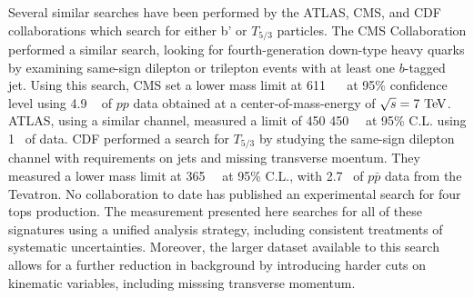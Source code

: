 Several similar searches have been performed by the ATLAS, CMS, and CDF collaborations which search for either b' or $T_{5/3}$ particles.
The CMS Collaboration performed a similar search, looking for fourth-generation down-type heavy quarks by examining same-sign dilepton or trilepton events with at least one $b$-tagged jet.
Using this search, CMS set a lower mass limit at 611~\GeV{} ~\cite{Chatrchyan:2012yea} at 95\% confidence level using 4.9 ~\ifb{} of $pp$ data obtained at a center-of-mass-energy of $\sqrt{s}=7 \TeV$.
ATLAS, using a similar channel, measured a limit of 450 450~\GeV{}~\cite{Aad:2012bb} at 95\% C.L. using 1~\ifb{} of data.                                     
CDF performed a search for $T_{5/3}$ by studying the same-sign dilepton channel with requirements on jets and missing transverse moentum.
They measured a lower mass limit at 365~\GeV{}~\cite{Aaltonen:2009nr} at 95\% C.L., with 2.7~\ifb{} of $p\bar{p}$ data from the Tevatron.  
No collaboration to date has published an experimental search for four tops production.
The measurement presented here searches for all of these signatures using a unified analysis strategy, including consistent treatments of systematic uncertainties.
Moreover, the larger dataset available to this search allows for a further reduction in background by introducing harder cuts on kinematic variables, including misssing transverse momentum.





